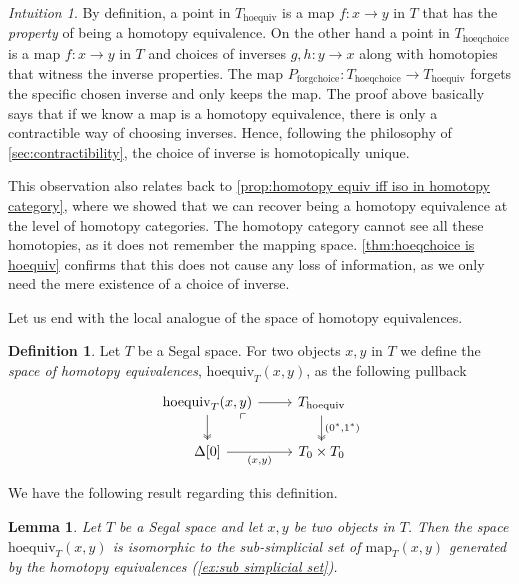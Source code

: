 \documentclass[11pt, a4paper]{amsart}
\newcommand{\map}{\mathrm{map}}
\newcommand{\hoequiv}{\mathrm{hoequiv}}
\newcommand{\hoeqchoice}{\mathrm{hoeqchoice}}
\newcommand{\forgchoice}{\mathrm{forgchoice}}
\newtheorem{lemma}[equation]{Lemma}
\theoremstyle{definition}
\newtheorem{definition}[equation]{Definition}
\theoremstyle{remark}
\newtheorem{intuition}[equation]{Intuition}
\numberwithin{equation}{section}
\begin{document}
\begin{intuition} \label{intuition:hoeqchoice is hoequiv}
  By definition, a point in $T_{\hoequiv}$ is a map $f\colon x \to y$ in $T$ that has the \emph{property} of being a homotopy equivalence. On the other hand a point in $T_{\hoeqchoice}$ is a map $f\colon x \to y$ in $T$ and choices of inverses $g,h\colon y \to x$ along with homotopies that witness the inverse properties. The map $P_{\forgchoice}\colon T_{\hoeqchoice} \to T_{\hoequiv}$ forgets the specific chosen inverse and only keeps the map. The proof above basically says that if we know a map is a homotopy equivalence, there is only a contractible way of choosing inverses. Hence, following the philosophy of \cref{sec:contractibility}, the choice of inverse is homotopically unique.  

  This observation also relates back to \cref{prop:homotopy equiv iff iso in homotopy category}, where we showed that we can recover being a homotopy equivalence at the level of homotopy categories. The homotopy category cannot see all these homotopies, as it does not remember the mapping space. \cref{thm:hoeqchoice is hoequiv} confirms that this does not cause any loss of information, as we only need the mere existence of a choice of inverse.
\end{intuition}
 
Let us end with the local analogue of the space of homotopy equivalences.
\begin{definition} \label{def:hoequiv space local}
 Let $T$ be a Segal space. For two objects $x, y$  in $T$ we define the \emph{space of homotopy equivalences}, $\hoequiv_{T}(x,y)$, as the following pullback
 \[
 \begin{tikzcd}
  \hoequiv_{T}(x,y) \arrow[r] \arrow[d, twoheadrightarrow] \arrow[dr, phantom, "\ulcorner", very near start] & T_{\hoequiv} \arrow[d, "{(0^* , 1^*)}", twoheadrightarrow] \\
  \Delta[0] \arrow[r, "{(x , y)}"'] & T_0 \times T_0
 \end{tikzcd}
 \]
\end{definition}

We have the following result regarding this definition.

\begin{lemma}
  Let $T$ be a Segal space and let $x,y$ be two objects in $T$. Then the space $\hoequiv_{T}(x,y)$ is isomorphic to the sub-simplicial set of $\map_{T}(x,y)$ generated by the homotopy equivalences (\cref{ex:sub simplicial set}).
\end{lemma}
\end{document}

